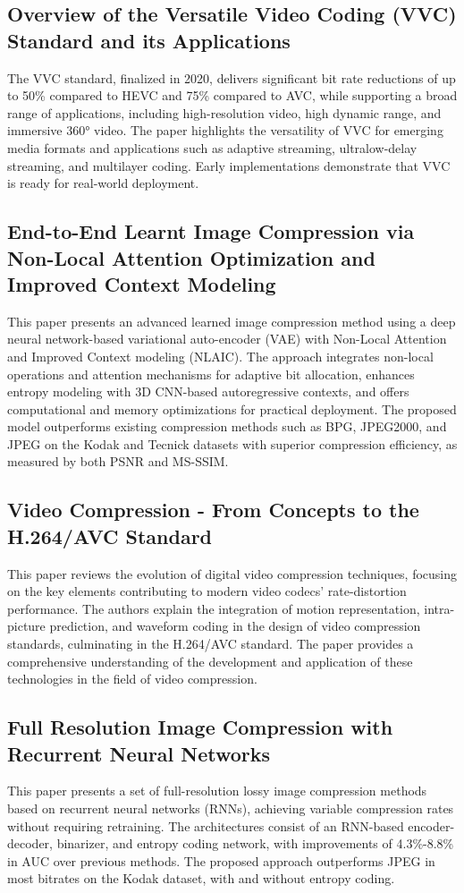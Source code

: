\documentclass[conference]{IEEEtran}
\begin{document}
\subsection{Overview of the Versatile Video Coding (VVC) Standard and its Applications \cite{hf06017}} 
The VVC standard, finalized in 2020, delivers significant bit rate reductions of up to 50\% compared to HEVC and 75\% compared to AVC, while supporting a broad range of applications, including high-resolution video, high dynamic range, and immersive 360° video. The paper highlights the versatility of VVC for emerging media formats and applications such as adaptive streaming, ultralow-delay streaming, and multilayer coding. Early implementations demonstrate that VVC is ready for real-world deployment.

\subsection{End-to-End Learnt Image Compression via Non-Local Attention Optimization and Improved Context Modeling \cite{hf06018}} 
This paper presents an advanced learned image compression method using a deep neural network-based variational auto-encoder (VAE) with Non-Local Attention and Improved Context modeling (NLAIC). The approach integrates non-local operations and attention mechanisms for adaptive bit allocation, enhances entropy modeling with 3D CNN-based autoregressive contexts, and offers computational and memory optimizations for practical deployment. The proposed model outperforms existing compression methods such as BPG, JPEG2000, and JPEG on the Kodak and Tecnick datasets with superior compression efficiency, as measured by both PSNR and MS-SSIM.

\subsection{Video Compression - From Concepts to the H.264/AVC Standard \cite{hf06019}} 
This paper reviews the evolution of digital video compression techniques, focusing on the key elements contributing to modern video codecs' rate-distortion performance. The authors explain the integration of motion representation, intra-picture prediction, and waveform coding in the design of video compression standards, culminating in the H.264/AVC standard. The paper provides a comprehensive understanding of the development and application of these technologies in the field of video compression.

\subsection{Full Resolution Image Compression with Recurrent Neural Networks \cite{hf06020}} 
This paper presents a set of full-resolution lossy image compression methods based on recurrent neural networks (RNNs), achieving variable compression rates without requiring retraining. The architectures consist of an RNN-based encoder-decoder, binarizer, and entropy coding network, with improvements of 4.3\%-8.8\% in AUC over previous methods. The proposed approach outperforms JPEG in most bitrates on the Kodak dataset, with and without entropy coding.
\end{document}
